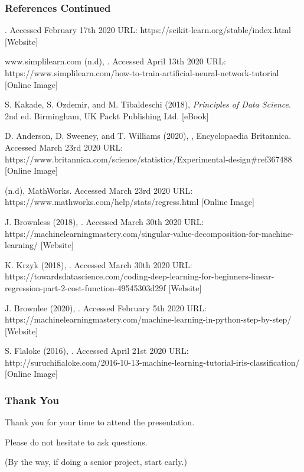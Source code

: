 \documentclass{beamer}
\begin{document}
\begin{frame}
\frametitle{References Continued}
\tiny
\begin{thebibliography}{9}

. Accessed February 17th 2020 URL: https://scikit-learn.org/stable/index.html [Website]

www.simplilearn.com (n.d),
. Accessed April 13th 2020 URL: https://www.simplilearn.com/how-to-train-artificial-neural-network-tutorial [Online Image]

S. Kakade, S. Ozdemir, and M. Tibaldeschi (2018),
\textit{Principles of Data Science}. 2nd ed. Birmingham, UK Packt Publishing Ltd. [eBook]

D. Anderson, D. Sweeney, and T. Williams (2020),
, Encyclopaedia Britannica. Accessed March 23rd 2020 
URL: https://www.britannica.com/science/statistics/Experimental-design\#ref367488 [Online Image]

 (n.d), MathWorks. Accessed March 23rd 2020 URL: https://www.mathworks.com/help/stats/regress.html [Online Image]

J. Brownless (2018),
. Accessed March 30th 2020 URL: https://machinelearningmastery.com/singular-value-decomposition-for-machine-learning/ [Website]

K. Krzyk (2018),
. Accessed March 30th 2020 URL: https://towardsdatascience.com/coding-deep-learning-for-beginners-linear-regression-part-2-cost-function-49545303d29f [Website]

J. Brownlee (2020),
. Accessed February 5th 2020 URL: https://machinelearningmastery.com/machine-learning-in-python-step-by-step/ [Website]

S. Flaloke (2016),
. Accessed April 21st 2020 URL: http://suruchifialoke.com/2016-10-13-machine-learning-tutorial-iris-classification/ [Online Image]

 \end{thebibliography}
\end{frame}

\begin{frame}
\frametitle{Thank You}
\Large
\center
\centering

Thank you for your time to attend the presentation.
\newline

Please do not hesitate to ask questions.
\newline

(By the way, if doing a senior project, start early.)
\end{frame}
\end{document}
